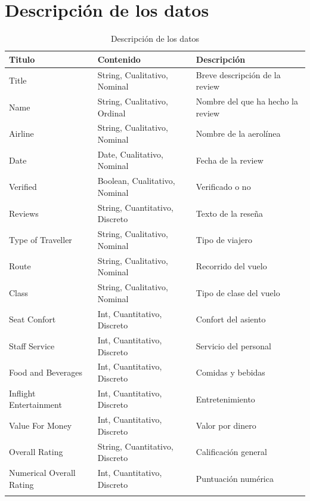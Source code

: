 \documentclass{report}
\begin{document}
        \section{Descripción de los datos}
            \begin{longtable}{|p{4cm}|p{}|p{}|}
                \hline
                \textbf{Titulo} & \textbf{Contenido}& \textbf{Descripción}\\
                \hline
                Title & String, Cualitativo, Nominal & Breve descripción de la review\\
                \hline
                Name & String, Cualitativo, Ordinal & Nombre del que ha hecho la review\\
                \hline
                Airline & String, Cualitativo, Nominal & Nombre de la aerolínea\\
                \hline
                Date & Date, Cualitativo, Nominal & Fecha de la review\\
                \hline
                Verified & Boolean, Cualitativo, Nominal & Verificado o no\\
                \hline
                Reviews & String, Cuantitativo, Discreto & Texto de la reseña\\
                \hline
                Type of Traveller & String, Cualitativo, Nominal & Tipo de viajero\\
                \hline
                Route & String, Cualitativo, Nominal & Recorrido del vuelo\\
                \hline
                Class & String, Cualitativo, Nominal & Tipo de clase del vuelo\\
                \hline
                Seat Confort & Int, Cuantitativo, Discreto & Confort del asiento\\
                \hline
                Staff Service & Int, Cuantitativo, Discreto & Servicio del personal\\
                \hline
                Food and Beverages & Int, Cuantitativo, Discreto & Comidas y bebidas\\
                \hline
                Inflight Entertainment & Int, Cuantitativo, Discreto & Entretenimiento\\
                \hline
                Value For Money & Int, Cuantitativo, Discreto & Valor por dinero\\
                \hline
                Overall Rating & String, Cuantitativo, Discreto & Calificación general\\
                \hline
                Numerical Overall Rating & Int, Cuantitativo, Discreto & Puntuación numérica\\
                \hline
                \caption{Descripción de los datos}
            \end{longtable}
            
\end{document}
